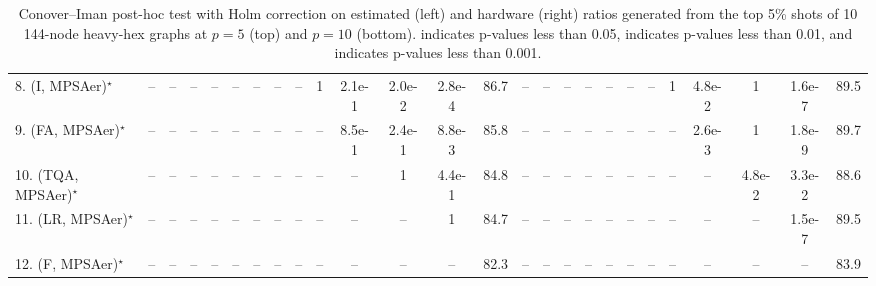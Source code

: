 \begin{table}[ht]
{\begin{tabular}{l|ccccccccccccc|cccccccccccc|}
8. (I, MPSAer)$^\star$ & -- & -- & -- & -- & -- & -- & -- & -- & 1 & 2.1e-1 & {\cellcolor[HTML]{B5E1AE}} \color[HTML]{000000} 2.0e-2 & {\cellcolor[HTML]{00441B}} \color[HTML]{F1F1F1} 2.8e-4 & 86.7 & -- & -- & -- & -- & -- & -- & -- & 1 & {\cellcolor[HTML]{B5E1AE}} \color[HTML]{000000} 4.8e-2 & 1 & {\cellcolor[HTML]{00441B}} \color[HTML]{F1F1F1} 1.6e-7 & 89.5 \\
9. (FA, MPSAer)$^\star$ & -- & -- & -- & -- & -- & -- & -- & -- & -- & 8.5e-1 & 2.4e-1 & {\cellcolor[HTML]{309950}} \color[HTML]{F1F1F1} 8.8e-3 & 85.8 & -- & -- & -- & -- & -- & -- & -- & -- & {\cellcolor[HTML]{309950}} \color[HTML]{F1F1F1} 2.6e-3 & 1 & {\cellcolor[HTML]{00441B}} \color[HTML]{F1F1F1} 1.8e-9 & 89.7 \\
10. (TQA, MPSAer)$^\star$ & -- & -- & -- & -- & -- & -- & -- & -- & -- & -- & 1 & 4.4e-1 & 84.8 & -- & -- & -- & -- & -- & -- & -- & -- & -- & {\cellcolor[HTML]{B5E1AE}} \color[HTML]{000000} 4.8e-2 & {\cellcolor[HTML]{B5E1AE}} \color[HTML]{000000} 3.3e-2 & 88.6 \\
11. (LR, MPSAer)$^\star$ & -- & -- & -- & -- & -- & -- & -- & -- & -- & -- & -- & 1 & 84.7 & -- & -- & -- & -- & -- & -- & -- & -- & -- & -- & {\cellcolor[HTML]{00441B}} \color[HTML]{F1F1F1} 1.5e-7 & 89.5 \\
12. (F, MPSAer)$^\star$ & -- & -- & -- & -- & -- & -- & -- & -- & -- & -- & -- & -- & 82.3 & -- & -- & -- & -- & -- & -- & -- & -- & -- & -- & -- & 83.9 \\
\hline

\end{tabular}
}
\caption{Conover–Iman post-hoc test with Holm correction on estimated (left) and hardware (right) ratios generated from the top 5\% shots of 10 144-node heavy-hex graphs at $p=5$ (top) and $p=10$ (bottom).  indicates p-values less than 0.05,  indicates p-values less than 0.01, and  indicates p-values less than 0.001.}
\label{tab:N144HH73_5_10_5pc_hw}
\end{table}